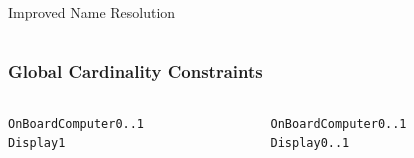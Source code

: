 \documentclass[table,15pt,t]{beamer}
\newcounter{i}
\begin{document}
\begin{frame}{Improved Name Resolution}
\begin{columns}
\begin{column}{0.5\textwidth}
    \end{column}
  \end{columns}

\end{frame}

\begin{frame}[fragile]
  \frametitle{Global Cardinality Constraints}
  \begin{columns}
    \begin{column}{0.5\textwidth}
      \begin{alltt}
        \begin{small}
\textsf{OnBoardComputer} 0..1
  \textsf{Display} 1
        \end{small}
      \end{alltt}
    \end{column}
\pause
    \begin{column}{0.5\textwidth}
      \begin{alltt}
        \begin{small}
\textsf{OnBoardComputer} 0..1
  \textsf{Display} 0..1
        \end{small}
      \end{alltt}
    \end{column}
  \end{columns}

\end{frame}
\end{document}
